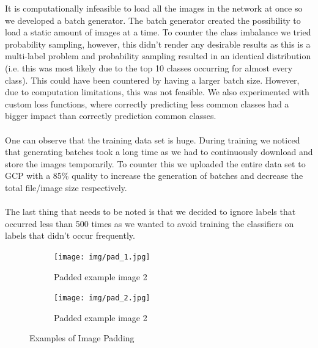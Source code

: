 \documentclass[twocolumn]{article}
\begin{document}
		It is computationally infeasible to load all the images in the network at once so we developed a batch generator. The batch generator created the possibility to load a static amount of images at a time. To counter the class imbalance we tried probability sampling, however, this didn't render any desirable results as this is a multi-label problem and probability sampling resulted in an identical distribution (i.e. this was most likely due to the top 10 classes occurring for almost every class). This could have been countered by having a larger batch size. However, due to computation limitations, this was not feasible. We also experimented with custom loss functions, where correctly predicting less common classes had a bigger impact than correctly prediction common classes.
		\\
		\\
		One can observe that the training data set is huge. During training we noticed that generating batches took a long time as we had to continuously download and store the images temporarily. To counter this we uploaded the entire data set to GCP with a 85\% quality to increase the generation of batches and decrease the total file/image size respectively.
		\\
		\\
		The last thing that needs to be noted is that we decided to ignore labels that occurred less than 500 times as we wanted to avoid training the classifiers on labels that didn't occur frequently.
		
        \begin{figure}
          \begin{subfigure}[b]{0.4\columnwidth}
            \texttt{[image: img/pad\_1.jpg]}
            \caption{Padded example image 2}
            \label{fig:pad1}
          \end{subfigure}
          \hfill %
          \begin{subfigure}[b]{0.4\columnwidth}
            \texttt{[image: img/pad\_2.jpg]}
            \caption{Padded example image 2}
            \label{fig:pad2}
          \end{subfigure}
          \caption{Examples of Image Padding}
        \end{figure}
        
\end{document}

